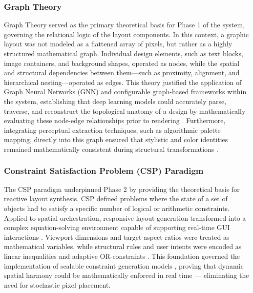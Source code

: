 \begin{refsection}
\subsubsection{Graph Theory}
Graph Theory served as the primary theoretical basis for Phase 1 of the system, governing the relational logic of the layout components. In this context, a graphic layout was not modeled as a flattened array of pixels, but rather as a highly structured mathematical graph. Individual design elements, such as text blocks, image containers, and background shapes, operated as nodes, while the spatial and structural dependencies between them—such as proximity, alignment, and hierarchical nesting—operated as edges. This theory justified the application of Graph Neural Networks (GNN) and configurable graph-based frameworks within the system, establishing that deep learning models could accurately parse, traverse, and reconstruct the topological anatomy of a design by mathematically evaluating these node-edge relationships prior to rendering \cite{Wu2022GNN}. Furthermore, integrating perceptual extraction techniques, such as algorithmic palette mapping, directly into this graph ensured that stylistic and color identities remained mathematically consistent during structural transformations \cite{Kosarev2022Synthesis}.

\subsubsection{Constraint Satisfaction Problem (CSP) Paradigm}
The CSP paradigm underpinned Phase 2 by providing the theoretical basis for reactive layout synthesis. CSP defined problems where the state of a set of objects had to satisfy a specific number of logical or arithmetic constraints. Applied to spatial orchestration, responsive layout generation transformed into a complex equation-solving environment capable of supporting real-time GUI interactions \cite{Lukes2021WebLayouts}. Viewport dimensions and target aspect ratios were treated as mathematical variables, while structural rules and user intents were encoded as linear inequalities and adaptive OR-constraints \cite{Chen2024Gestalt}. This foundation governed the implementation of scalable constraint generation models \cite{Jiang2023LayoutFormer, MosqueiraRey2023HumanLoop}, proving that dynamic spatial harmony could be mathematically enforced in real time — eliminating the need for stochastic pixel placement.


\end{refsection}
